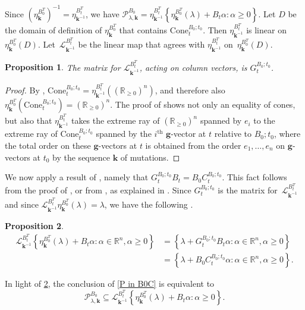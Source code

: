 \documentclass{amsart}
\newtheorem{proposition}{Proposition}[section]
\theoremstyle{definition}
\theoremstyle{remark}
\numberwithin{equation}{section}
\newcommand{\reals}{\mathbb R}
\newcommand{\set}[1]{{\left\lbrace #1 \right\rbrace}}
\renewcommand{\th}{^\text{th}}
\newcommand{\0}{{\mathbf{0}}}
\newcommand{\Cone}{\mathrm{Cone}}
\newcommand{\g}{\mathbf{g}}
\newcommand{\kk}{\mathbf{k}}
\renewcommand{\L}{\mathcal{L}}
\renewcommand{\P}{\mathcal{P}}
\renewcommand{\th}{^\text{th}}
\begin{document}
Since $\left(\eta_{\kk}^{B_0^T}\right)^{-1}=\eta_{\kk^{-1}}^{B_t^T}$, we have $\P^{B_0}_{\lambda,\kk}=\eta_{\kk^{-1}}^{B_t^T}\set{\eta_\kk^{B_0^T}(\lambda)+B_t\alpha:\alpha\ge0}$.
Let $D$ be the domain of definition of $\eta_{\kk}^{B_0^T}$  that contains $\Cone^{B_0;t_0}_t$.
Then $\eta_{\kk^{-1}}^{B_t^T}$ is linear on $\eta_{\kk}^{B_0^T}(D)$.
Let~$\L_{\kk^{-1}}^{B_t^T}$ be the linear map that agrees with $\eta_{\kk^{-1}}^{B_t^T}$ on~$\eta_{\kk}^{B_0^T}(D)$.

\begin{proposition}\label{L mat}
The matrix for $\L_{\kk^{-1}}^{B_t^T}$, acting on column vectors, is $G_t^{B_0;t_0}$.
\end{proposition}
\begin{proof}
By \cite[Proposition~8.13]{universal}, $\Cone^{B_0;t_0}_t=\eta_{\kk^{-1}}^{B_t^T}\left(\left(\reals_{\ge0}\right)^n\right)$, and therefore also ${\eta_\kk^{B_0^T}\left(\Cone^{B_0;t_0}_t\right)=\left(\reals_{\ge0}\right)^n}$.
The proof of \cite[Proposition~8.13]{universal} shows not only an equality of cones, but also that $\eta_{\kk^{-1}}^{B_t^T}$ takes the extreme ray of $\left(\reals_{\ge0}\right)^n$ spanned by $e_i$ to the extreme ray of $\Cone^{B_0;t_0}_t$ spanned by the $i\th$ $\g$-vector at $t$ relative to $B_0;t_0$, where the total order on these $\g$-vectors at $t$ is obtained from the order $e_1,\ldots,e_n$ on $\g$-vectors at $t_0$ by the sequence $\kk$ of mutations.
\end{proof}

We now apply a result of \cite{NZ12}, namely that $G_t^{B_0;t_0}B_t=B_0C_t^{B_0;t_0}$.
This fact follows from the proof of \cite[Proposition~1.3]{NZ12}, or from \cite[(6.14)]{FZ07}, as explained in \cite[Remark~2.1]{NZ12}.
Since $G_t^{B_0;t_0}$ is the matrix for~$\L_{\kk^{-1}}^{B_t^T}$ and since $\L_{\kk^{-1}}^{B_t^T}\eta_\kk^{B_0^T}(\lambda)=\lambda$, we have the following .

\begin{proposition}\label{B0C}
\begin{align*}
\L_{\kk^{-1}}^{B_t^T}\set{\eta_\kk^{B_0^T}(\lambda)+B_t\alpha:\alpha\in\reals^n,\alpha\ge0}
&=\set{\lambda+G_t^{B_0;t_0}B_t\alpha:\alpha\in\reals^n,\alpha\ge0}\\
&=\set{\lambda+B_0C_t^{B_0;t_0}\alpha:\alpha\in\reals^n,\alpha\ge0}.
\end{align*}
\end{proposition}

In light of \cref{B0C}, the conclusion of \cref{P in B0C} is equivalent to
\[\P^{B_0}_{\lambda,\kk}\subseteq\L_{\kk^{-1}}^{B_t^T}\set{\eta_\kk^{B_0^T}(\lambda)+B_t\alpha:\alpha\ge0}.\]
\end{document}
